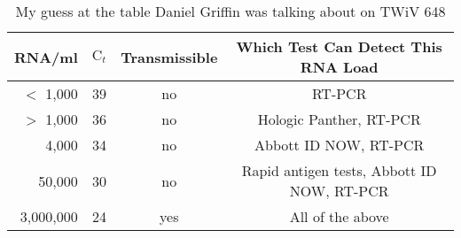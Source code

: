 \documentclass[11pt, oneside]{article}   	%
\begin{document}
\begin{table}
  \begin{center}
    \begin{tabular}{r|c|c|c} 
      \textbf{RNA/ml} & \textbf{$\text{C}_t$} & \textbf{Transmissible} & \textbf{Which Test Can Detect This RNA Load} \\
      \hline 
      \hline 
      $<$ 1,000     & 39 & no    & RT-PCR                                                            \\
      $>$ 1,000     & 36 & no    & Hologic Panther, RT-PCR                                 \\
      4,000            & 34 & no    & Abbott ID NOW, RT-PCR                                  \\
      50,000          & 30 & no    & Rapid antigen tests, Abbott ID NOW, RT-PCR  \\
      3,000,000     & 24 & yes  & All of the above
    \end{tabular}
  \end{center}
 \caption{My guess at the table Daniel Griffin was talking about on TWiV 648}
\end{table}
\end{document}
